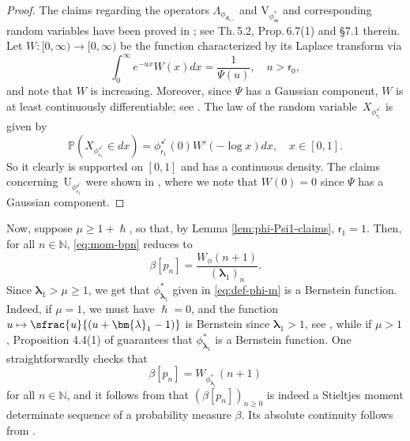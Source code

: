 \documentclass[JEP,XML,SOM,Unicode]{cedram}
\let\epsilon\varepsilon
\newcommand\mto{\mathchoice{\longmapsto}{\mapsto}{\mapsto}{\mapsto}}
\newcommand{\spfrac}[2]{\sfrac{#1}{(#2)}}
\theoremstyle{plain}
\theoremstyle{definition}
\newcommand{\N}{\mathbb{N}}
\newcommand{\Prob}{\mathbb{P}}
\newcommand{\m}{\mathfrak{m}}
\newcommand{\dz}{{\bm{d}}_{1,\epsilon}}
\newcommand{\lam}{{\bm{\lambda}_1}}
\newcommand{\tet}{{\mathsf{r}_0}}
\newcommand{\vat}{{\mathsf{r}_1}}
\newcommand{\phm}{{\phi_\m^*}}
\renewcommand{\varphi}{{\phi_{\vat}^{\checkmark}}}
\let\h\hslash
\let\mo\mu
\let\bpsi\beta
\begin{document}
\begin{proof}
The claims regarding the operators $\Lambda_{\phi_{\dz}}$ and $\mathrm{V}_{\phm}$ and corresponding random variables have been proved in \cite{Patie-Savov-GeL}; see Th.\,5.2, Prop.\,6.7(1) and \S 7.1 therein. Let $W \colon [0,\infty) \to [0,\infty)$ be the function characterized by its Laplace transform via
\begin{equation*}
\int_{0}^{\infty}e^{-u x}W(x)dx = \frac{1}{\Psi(u)}, \quad u > \tet,
\end{equation*}
and note that $W$ is increasing. Moreover, since $\Psi$ has a Gaussian component, $W$ is at least continuously differentiable; see \eg \cite[\S 8.2]{Kyprianou2014}. The law of the random variable~$X_\varphi$ is given by
\begin{equation*}
\Prob(X_\varphi \in dx) = \varphi(0)W'(-\log x)dx, \quad x \in [0,1].
\end{equation*}
So it clearly is supported on $[0,1]$ and has a continuous density. The claims concerning~$\mathrm{U}_{\varphi}$ were shown in \cite[Lem.\,4.2]{Intertwining-Krein}, where we note that $W(0)=0$ since $\Psi$ has a Gaussian component.
\end{proof}

Now, suppose $\mo \geq 1+\h$, so that, by Lemma \ref{lem:phi-Psi1-claims}, $\vat= 1$. Then, for all $n\in\N$, \eqref{eq:mom-bpn} reduces to
\begin{equation*}
\bpsi[p_n] = \frac{W_{\phi}(n+1)}{(\lam)_n}.
\end{equation*}
Since $\lam > \mo \geq 1$, we get that $\phi_{\lam}^*$ given in \eqref{eq:def-phi-m} is a Bernstein function. Indeed, if $\mo = 1$, we must have $\h = 0$, and the function $u \mto \spfrac{u}{u+\lam-1}$ is Bernstein since $\lam > 1$, see \eg \cite[Chap.\,16]{SchillingSongVondracek10}, while if $\mo > 1$, Proposition 4.4(1) of \cite{SchillingSongVondracek10}
guarantees that $\phi_{\lam}^*$ is a Bernstein function. One straightforwardly checks that
\begin{equation*}
\bpsi[p_n] = W_{\phi_{\lam}^*}(n+1)
\end{equation*}
for all $n\in \mathbb{N}$, and it follows from \cite{Berg} that $(\bpsi [p_n])_{n\geq 0}$ is indeed a Stieltjes moment determinate sequence of a probability measure $\bpsi$. Its absolute continuity follows from \cite[Prop.\,2.4]{Patie-11-Factorization_e}.
\end{document}
